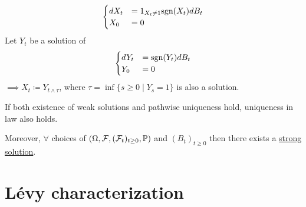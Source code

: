 \begin{example}\label{ex:1.9}
    \[\begin{cases}
        dX_t&=1_{X_t\neq 1}\text{sgn}(X_t)dB_t\\
        X_0&=0
    \end{cases}\]
    Let $Y_t$ be a solution of \[\begin{cases}
        dY_t&=\text{sgn}(Y_t)dB_t\\
        Y_0&=0
    \end{cases}\]
    $\implies X_t\coloneqq Y_{t\land \tau}$, where $\tau=\inf\{s\geq 0\mid Y_s=1\}$ is also a solution.
\end{example}

\begin{theorem}\label{thm:1.10-Yamada-Watanabe}
    If both existence of weak solutions and pathwise uniqueness hold, uniqueness in law also holds.
    
    Moreover, $\forall$ choices of $(\Omega,\mathcal{F},(\mathcal{F}_t)_{t\geq 0},\mathbb{P})$ and $(B_t)_{t\geq 0}$ then there exists a \hyperref[def:strong_solution]{strong solution}.
\end{theorem}

\section{Lévy characterization}


